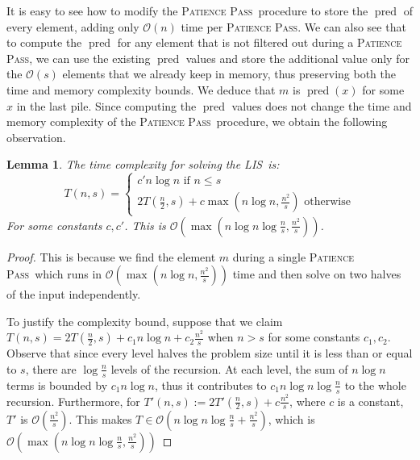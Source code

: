 \documentclass[lic, english, shortabstract]{iithesis}
\theoremstyle{plain}
\newtheorem{lemma}[theorem]{Lemma}
\newcommand{\Lis}{\textsc{LIS}}
\newcommand{\Ppass}{\textsc{Patience Pass}}
\theoremstyle{definition}
\begin{document}
It is easy to see how to modify the \Ppass\ procedure to store the $\operatorname{pred}$ of every element, adding only $\mathcal{O}(n)$ time per \Ppass.
We can also see that to compute the $\operatorname{pred}$ for any element that is not filtered out during a \Ppass, we can use the existing $\operatorname{pred}$ values 
and store the additional value only for the $\mathcal{O}(s)$ elements that we already keep in memory, thus preserving both the time and memory complexity bounds.
We deduce that $m$ is $\operatorname{pred}(x)$ for some $x$ in the last pile. Since computing the $\operatorname{pred}$ values does not change the time and memory complexity of the \Ppass\ procedure, we obtain the following observation.

\begin{lemma}The time complexity for solving the \Lis\ is:
$$T(n, s) = \begin{cases}
c'n \log n \text{ if } n \leq s \\
2T(\frac{n}{2}, s) + c\operatorname{max}(n \log n, \frac{n^2}{s}) \text{ otherwise}
\end{cases}$$
For some constants $c, c'$. This is $\mathcal{O}(\operatorname{max}(n \log n \log \frac{n}{s}, \frac{n^2}{s}))$.
\end{lemma}
\begin{proof}
This is because we find the element $m$ during a single \Ppass\ which runs in $\mathcal{O}(\operatorname{max}(n \log n, \frac{n^2}{s}))$ time and then solve on two halves of the input independently.

To justify the complexity bound, suppose that we claim $T(n, s) = 2T(\frac{n}{2}, s) + c_1n \log n + c_2\frac{n^2}{s}$ when $n > s$ for some constants $c_1, c_2$.
Observe that since every level halves the problem size until it is less than or equal to $s$, there are $\log \frac{n}{s} $ levels of the recursion. 
At each level, the sum of $n \log n$ terms is bounded by $c_1 n \log n$, thus it contributes to $c_1 n \log n \log \frac{n}{s}$ to the whole recursion.
Furthermore, for $T'(n, s) := 2T'(\frac{n}{2}, s) + c\frac{n^2}{s}$, where $c$ is a constant, $T'$ is $\mathcal{O}(\frac{n^2}{s})$. \newline
This makes $T \in \mathcal{O}(n \log n \log \frac{n}{s} + \frac{n^2}{s})$, which is $\mathcal{O}(\operatorname{max}(n \log n \log \frac{n}{s},\frac{n^2}{s}))$ 

\end{proof}
\end{document}
